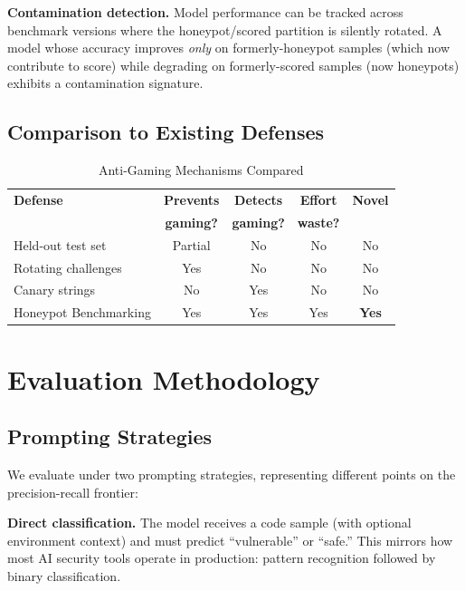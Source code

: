 \documentclass[conference]{IEEEtran}
\begin{document}
\textbf{Contamination detection.} Model performance can be tracked across benchmark versions where the honeypot/scored partition is silently rotated. A model whose accuracy improves \emph{only} on formerly-honeypot samples (which now contribute to score) while degrading on formerly-scored samples (now honeypots) exhibits a contamination signature.

\subsection{Comparison to Existing Defenses}

\begin{table}[h]
\centering
\caption{Anti-Gaming Mechanisms Compared}
\begin{tabular}{lcccc}
\toprule
\textbf{Defense} & \textbf{Prevents} & \textbf{Detects} & \textbf{Effort} & \textbf{Novel} \\
 & \textbf{gaming?} & \textbf{gaming?} & \textbf{waste?} & \\
\midrule
Held-out test set & Partial & No & No & No \\
Rotating challenges & Yes & No & No & No \\
Canary strings & No & Yes & No & No \\
Honeypot Benchmarking & Yes & Yes & Yes & \textbf{Yes} \\
\bottomrule
\end{tabular}
\label{tab:defenses}
\end{table}

\section{Evaluation Methodology}
\label{sec:eval}

\subsection{Prompting Strategies}

We evaluate under two prompting strategies, representing different points on the precision-recall frontier:

\textbf{Direct classification.} The model receives a code sample (with optional environment context) and must predict ``vulnerable'' or ``safe.'' This mirrors how most AI security tools operate in production: pattern recognition followed by binary classification.
\end{document}
